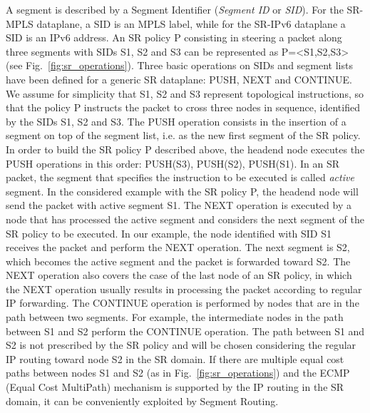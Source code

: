 A segment is described by a Segment Identifier (\textit{Segment ID} or \textit{SID}). For the SR-MPLS dataplane, a SID is an MPLS label, while for the SR-IPv6 dataplane a SID is an IPv6 address. An SR policy P consisting in steering a packet along three segments with SIDs S1, S2 and S3 can be represented as P=<S1,S2,S3> (see Fig.~\ref{fig:sr_operations}). Three basic operations on SIDs and segment lists have been defined for a generic SR dataplane: PUSH, NEXT and CONTINUE. We assume for simplicity that S1, S2 and S3 represent topological instructions, so that the policy P instructs the packet to cross three nodes in sequence, identified by the SIDs S1, S2 and S3. 
The PUSH operation consists in the insertion of a segment on top of the segment list, i.e. as the new first segment of the SR policy. In order to build the SR policy P described above, the headend node executes the PUSH operations in this order: PUSH(S3), PUSH(S2), PUSH(S1). In an SR packet, the segment that specifies the instruction to be executed is called \textit{active} segment. In the considered example with the SR policy P, the headend node will send the packet with active segment S1. The NEXT operation is executed by a node that has processed the active segment and considers the next segment of the SR policy to be executed. In our example, the node identified with SID S1 receives the packet and perform the NEXT operation. The next segment is S2, which becomes the active segment and the packet is forwarded toward S2. The NEXT operation also covers the case of the last node of an SR policy, in which the NEXT operation usually results in processing the packet according to regular IP forwarding. The CONTINUE operation is performed by nodes that are in the path between two segments. For example, the intermediate nodes in the path between S1 and S2 perform the CONTINUE operation. The path between S1 and S2 is not prescribed by the SR policy and will be chosen considering the regular IP routing toward node S2 in the SR domain. If there are multiple equal cost paths between nodes S1 and S2 (as in Fig.~\ref{fig:sr_operations}) and the ECMP (Equal Cost MultiPath) mechanism is supported by the IP routing in the SR domain, it can be conveniently exploited by Segment Routing. 

